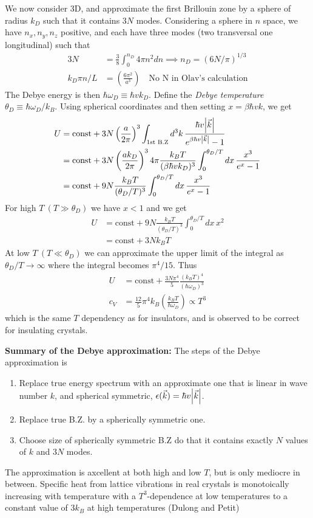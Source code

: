 \documentclass[a4paper, english, 12pt]{article}
\newcommand{\eps}{\epsilon}
\newcommand{\closed}[1]{\left( #1 \right)}
\begin{document}
\begin{multicols*}{2}
We now consider 3D, and approximate the first Brillouin zone by a sphere of radius $k_D$ such that it contains $3N$ modes. Considering a sphere in $n$ space, we have $n_x,n_y,n_z$ positive, and each have three modes (two transversal one longitudinal) such that 
\begin{align*}
    3N&=\frac{3}{8}\int_0^{n_D} 4\pi n^2 dn \implies n_D = (6N/\pi)^{1/3} \\ 
    k_D \pi n/L &= \closed{\frac{6\pi^2}{a^3}}\quad \text{No N in Olav's calculation}
\end{align*}
The Debye energy is then $\hbar \omega_D\equiv \hbar v k_D$. Define the \textit{Debye temperature} $\theta_D\equiv \hbar \omega_D/k_B$. Using spherical coordinates and then setting $x=\beta\hbar v k$, we get 
\begin{align*}
    U &= \text{const} + 3N\closed{\frac{a}{2\pi}}^3 \int_{\text{1st B.Z}} d^3 k\,\frac{\hbar v \abs{\vec{k}}}{e^{\beta\hbar v \abs{\vec{k}}} - 1} \\ 
    &= \text{const} + 3N\closed{\frac{a k_D}{2\pi}}^3 4\pi \frac{k_B T}{(\beta\hbar vk_D)^3} \int_0^{\theta_D / T} dx\, \frac{x^3}{e^x - 1} \\ 
    &= \text{const} + 9N \frac{k_B T}{(\theta_D / T)^3} \int_0^{\theta_D / T} dx\, \frac{x^3}{e^x - 1}
\end{align*}
For high $T\:(T\gg\theta_D)$ we have $x<1$ and we get 
\begin{align*}
    U &= \text{const} + 9N \frac{k_B T}{(\theta_D / T)^3} \int_0^{\theta_D / T} dx\, x^2 \\
    &= \text{const} + 3N k_B T
\end{align*}
At low $T\:(T\ll\theta_D)$ we can approximate the upper limit of the integral as $\theta_D/T\to\infty$ where the integral becomes $\pi^4/15$. Thus 
\begin{align*}
    U &= \text{const} + \frac{3N\pi^4}{5} \frac{(k_B T)^4}{(\hbar\omega_D)^3} \\ 
    c_V &= \frac{12}{5}\pi^4 k_B \closed{\frac{k_B T}{\hbar\omega_D}} \propto T^3 
\end{align*}
which is the same $T$ dependency as for insulators, and is observed to be correct for insulating crystals. 

\textbf{Summary of the Debye approximation:}
The steps of the Debye approximation is  
\begin{enumerate}
    \item Replace true energy spectrum with an approximate one that is linear in wave number $k$, and spherical symmetric, $\eps(\vec{k})=\hbar v \abs{\vec{k}}$.
    \item Replace true B.Z. by a spherically symmetric one. 
    \item Choose size of spherically symmetric B.Z do that it contains exactly $N$ values of $k$ and $3N$ modes. 
\end{enumerate} 
The approximation is axcellent at both high and low $T$, but is only mediocre in between. Specific heat from lattice vibrations in real crystals is monotoically increasing with temperature with a $T^3$-dependence at low temperatures to a constant value of $3k_B$ at high temperatures (Dulong and Petit) 


\end{multicols*}
\end{document}
